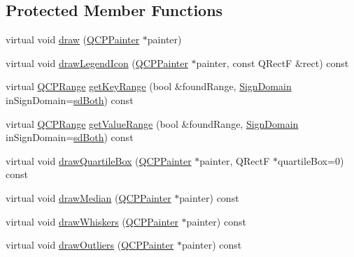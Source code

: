 \subsection*{Protected Member Functions}
\begin{DoxyCompactItemize}
\item 
virtual void \hyperlink{class_q_c_p_statistical_box_a753b62761217dd6b92f8a29e286a1317}{draw} (\hyperlink{class_q_c_p_painter}{Q\+C\+P\+Painter} $\ast$painter)
\item 
virtual void \hyperlink{class_q_c_p_statistical_box_a51764ed423fa02d3ef63f6848851ec33}{draw\+Legend\+Icon} (\hyperlink{class_q_c_p_painter}{Q\+C\+P\+Painter} $\ast$painter, const Q\+Rect\+F \&rect) const 
\item 
virtual \hyperlink{class_q_c_p_range}{Q\+C\+P\+Range} \hyperlink{class_q_c_p_statistical_box_ad700fdce0f456dd22a3679d61e9896a4}{get\+Key\+Range} (bool \&found\+Range, \hyperlink{class_q_c_p_abstract_plottable_a661743478a1d3c09d28ec2711d7653d8}{Sign\+Domain} in\+Sign\+Domain=\hyperlink{class_q_c_p_abstract_plottable_a661743478a1d3c09d28ec2711d7653d8a082b98cfb91a7363a3b5cd17b0c1cd60}{sd\+Both}) const 
\item 
virtual \hyperlink{class_q_c_p_range}{Q\+C\+P\+Range} \hyperlink{class_q_c_p_statistical_box_adeef8c9a0361683c776bca2fbff292b7}{get\+Value\+Range} (bool \&found\+Range, \hyperlink{class_q_c_p_abstract_plottable_a661743478a1d3c09d28ec2711d7653d8}{Sign\+Domain} in\+Sign\+Domain=\hyperlink{class_q_c_p_abstract_plottable_a661743478a1d3c09d28ec2711d7653d8a082b98cfb91a7363a3b5cd17b0c1cd60}{sd\+Both}) const 
\item 
virtual void \hyperlink{class_q_c_p_statistical_box_a9ad0abdb154fefb04e9872f0db8e2ec7}{draw\+Quartile\+Box} (\hyperlink{class_q_c_p_painter}{Q\+C\+P\+Painter} $\ast$painter, Q\+Rect\+F $\ast$quartile\+Box=0) const 
\item 
virtual void \hyperlink{class_q_c_p_statistical_box_a16fef8bc19e5a09d82033edcfe919495}{draw\+Median} (\hyperlink{class_q_c_p_painter}{Q\+C\+P\+Painter} $\ast$painter) const 
\item 
virtual void \hyperlink{class_q_c_p_statistical_box_a6f8d093ec7e404529388d02da4c72b34}{draw\+Whiskers} (\hyperlink{class_q_c_p_painter}{Q\+C\+P\+Painter} $\ast$painter) const 
\item 
virtual void \hyperlink{class_q_c_p_statistical_box_a60ebb332a497f51ace837767db5105b9}{draw\+Outliers} (\hyperlink{class_q_c_p_painter}{Q\+C\+P\+Painter} $\ast$painter) const 
\end{DoxyCompactItemize}
